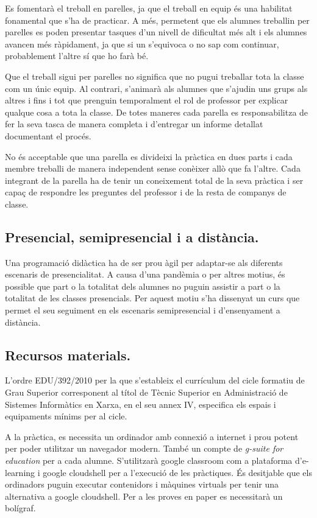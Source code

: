 \documentclass[catalan, a4paper, 12pt, titlepage]{article}
\begin{document}
Es fomentarà el treball en parelles, ja que el treball en equip és una habilitat fonamental que s'ha de practicar.
A més, permetent que els alumnes treballin per parelles es poden presentar tasques d'un nivell de dificultat més alt i els alumnes avancen més ràpidament, ja que si un s'equivoca o no sap com continuar, probablement l'altre sí que ho farà bé.

Que el treball sigui per parelles no significa que no pugui treballar tota la classe com un únic equip.
Al contrari, s'animarà als alumnes que s'ajudin uns grups als altres i fins i tot que prenguin temporalment el rol de professor per explicar qualque cosa a tota la classe.
De totes maneres cada parella es responsabilitza de fer la seva tasca de manera completa i d'entregar un informe detallat documentant el procés.

No és acceptable que una parella es divideixi la pràctica en dues parts i cada membre treballi de manera independent sense conèixer allò que fa l'altre. 
Cada integrant de la parella ha de tenir un coneixement total de la seva pràctica i ser capaç de respondre les preguntes del professor i de la resta de companys de classe.

\subsection{Presencial, semipresencial i a distància.}

Una programació didàctica ha de ser prou àgil per adaptar-se als diferents escenaris de presencialitat.
A causa d'una pandèmia o per altres motius, és possible que part o la totalitat dels alumnes no puguin assistir a part o la totalitat de les classes presencials.
Per aquest motiu s'ha dissenyat un curs que permet el seu seguiment en els escenaris semipresencial i d'ensenyament a distància.

\subsection{Recursos materials.}

L'ordre EDU/392/2010 per la que s'estableix el currículum del cicle formatiu de Grau Superior corresponent al títol de Tècnic Superior en Administració de Sistemes Informàtics en Xarxa, en el seu annex IV, especifica els espais i equipaments mínims per al cicle.

A la pràctica, es necessita un ordinador amb connexió a internet i prou potent per poder utilitzar un navegador modern. També un compte de \emph{g-suite for education} per a cada alumne. S'utilitzarà google classroom com a plataforma d'e-learning i google cloudshell per a l'execució de les pràctiques. És desitjable que els ordinadors puguin executar contenidors i màquines virtuals per tenir una alternativa a google cloudshell. Per a les proves en paper es necessitarà un bolígraf.
\end{document}

